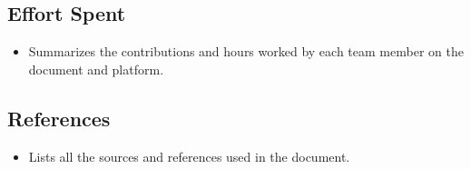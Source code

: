 \subsection*{Effort Spent}
\begin{itemize}
    \item Summarizes the contributions and hours worked by each team member on the document and platform.
\end{itemize}

\subsection*{References}
\begin{itemize}
    \item Lists all the sources and references used in the document.
\end{itemize}
